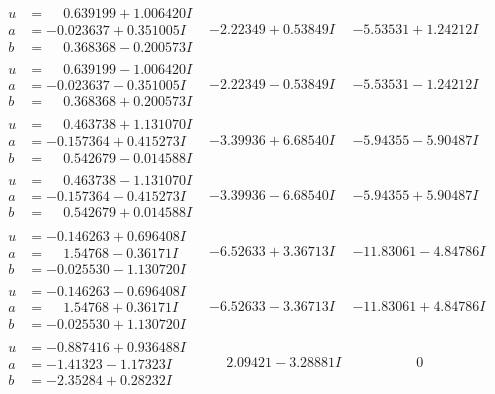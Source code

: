 \documentclass[1p]{elsarticle_modified}
\theoremstyle{definition}
\begin{document}
$$\begin{array}{c|c|c}
\begin{aligned}
u &= \phantom{-}0.639199 + 1.006420 I \\
a &= -0.023637 + 0.351005 I \\
b &= \phantom{-}0.368368 - 0.200573 I\end{aligned}
 & -2.22349 + 0.53849 I & -5.53531 + 1.24212 I \\ \hline\begin{aligned}
u &= \phantom{-}0.639199 - 1.006420 I \\
a &= -0.023637 - 0.351005 I \\
b &= \phantom{-}0.368368 + 0.200573 I\end{aligned}
 & -2.22349 - 0.53849 I & -5.53531 - 1.24212 I \\ \hline\begin{aligned}
u &= \phantom{-}0.463738 + 1.131070 I \\
a &= -0.157364 + 0.415273 I \\
b &= \phantom{-}0.542679 - 0.014588 I\end{aligned}
 & -3.39936 + 6.68540 I & -5.94355 - 5.90487 I \\ \hline\begin{aligned}
u &= \phantom{-}0.463738 - 1.131070 I \\
a &= -0.157364 - 0.415273 I \\
b &= \phantom{-}0.542679 + 0.014588 I\end{aligned}
 & -3.39936 - 6.68540 I & -5.94355 + 5.90487 I \\ \hline\begin{aligned}
u &= -0.146263 + 0.696408 I \\
a &= \phantom{-}1.54768 - 0.36171 I \\
b &= -0.025530 - 1.130720 I\end{aligned}
 & -6.52633 + 3.36713 I & -11.83061 - 4.84786 I \\ \hline\begin{aligned}
u &= -0.146263 - 0.696408 I \\
a &= \phantom{-}1.54768 + 0.36171 I \\
b &= -0.025530 + 1.130720 I\end{aligned}
 & -6.52633 - 3.36713 I & -11.83061 + 4.84786 I \\ \hline\begin{aligned}
u &= -0.887416 + 0.936488 I \\
a &= -1.41323 - 1.17323 I \\
b &= -2.35284 + 0.28232 I\end{aligned}
 & \phantom{-}2.09421 - 3.28881 I & \phantom{-0.000000 } 0 \\ \hline\begin{aligned}

\end{aligned}
\end{array}$$
\end{document}
